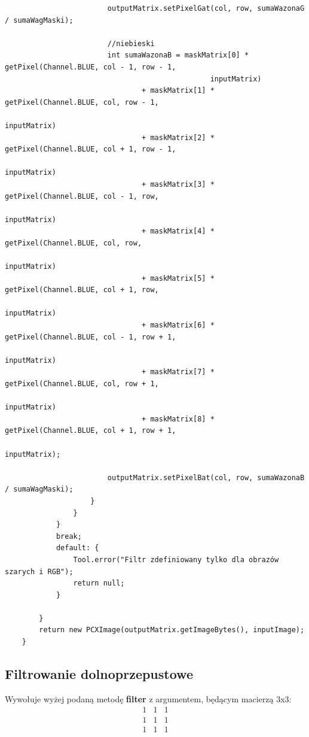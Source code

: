 \documentclass{article}
\begin{document}
\begin{verbatim}
                        outputMatrix.setPixelGat(col, row, sumaWazonaG / sumaWagMaski);

                        //niebieski
                        int sumaWazonaB = maskMatrix[0] * getPixel(Channel.BLUE, col - 1, row - 1, 
												inputMatrix)
                                + maskMatrix[1] * getPixel(Channel.BLUE, col, row - 1, 
																inputMatrix)
                                + maskMatrix[2] * getPixel(Channel.BLUE, col + 1, row - 1, 
																inputMatrix)
                                + maskMatrix[3] * getPixel(Channel.BLUE, col - 1, row, 
																inputMatrix)
                                + maskMatrix[4] * getPixel(Channel.BLUE, col, row, 
																inputMatrix)
                                + maskMatrix[5] * getPixel(Channel.BLUE, col + 1, row, 
																inputMatrix)
                                + maskMatrix[6] * getPixel(Channel.BLUE, col - 1, row + 1, 
																inputMatrix)
                                + maskMatrix[7] * getPixel(Channel.BLUE, col, row + 1, 
																inputMatrix)
                                + maskMatrix[8] * getPixel(Channel.BLUE, col + 1, row + 1, 
																inputMatrix);

                        outputMatrix.setPixelBat(col, row, sumaWazonaB / sumaWagMaski);
                    }
                }
            }
            break;
            default: {
                Tool.error("Filtr zdefiniowany tylko dla obrazów szarych i RGB");
                return null;
            }

        }
        return new PCXImage(outputMatrix.getImageBytes(), inputImage);
    }
	\end{verbatim}
	
	\subsection{Filtrowanie dolnoprzepustowe}
	Wywołuje wyżej podaną metodę \textbf{filter} z argumentem, będącym macierzą 3x3:
	\begin{equation*}
	\begin{matrix}
	1 & 1 & 1 \\
	1 & 1 & 1 \\
	1 & 1 & 1
	\end{matrix}
	\end{equation*}
		
\end{document}
